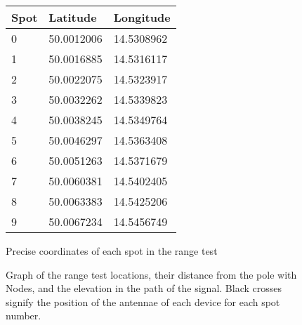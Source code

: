 \begin{figure}[H]
\begin{minipage}[t]{.45\textwidth}
\begin{tabular}{|l|l|l|}
        \textbf{Spot} & \textbf{Latitude} & \textbf{Longitude} \\ \hline
        0   & 50.0012006 & 14.5308962 \\ \hline
        1   & 50.0016885 & 14.5316117 \\ \hline
        2   & 50.0022075 & 14.5323917 \\ \hline
        3   & 50.0032262 & 14.5339823 \\ \hline
        4   & 50.0038245 & 14.5349764 \\ \hline
        5   & 50.0046297 & 14.5363408 \\ \hline
        6   & 50.0051263 & 14.5371679 \\ \hline
        7   & 50.0060381 & 14.5402405 \\ \hline
        8   & 50.0063383 & 14.5425206 \\ \hline
        9   & 50.0067234 & 14.5456749 \\ \hline
        \end{tabular}
    \end{minipage}
    \caption{Precise coordinates of each spot in the range test}
\end{figure}

\begin{figure}[H]
    \centering
    \subfloat[SF11-FAR1]{} \hfil
    \subfloat[SF11-FAR2]{}
    \caption{\label{fig:range-elevation-far}Graph of the range test locations, their distance from the pole with Nodes, and the elevation in the path of the signal. Black crosses signify the position of the antennae of each device for each spot number.}
\end{figure}